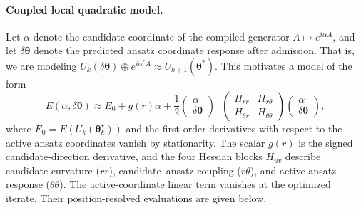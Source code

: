 \documentclass[
  reprint,
  amsmath,
  amssymb,
  aps,
  pra,
  nofootinbib,
  superscriptaddress,
  floatfix
]{revtex4-2}
\begin{document}
\paragraph*{Coupled local quadratic model.}
%
 Let \(\alpha\) denote the candidate coordinate of the compiled generator $A \mapsto e^{i\alpha A}$, and let $\delta \boldsymbol{\theta}$ denote the predicted ansatz coordinate response after admission. That is, we are modeling $U_k(\delta \boldsymbol{\theta})\oplus e^{i\alpha^* A}\approx U_{k+1}(\boldsymbol{\theta}^*)$. This motivates a model of the form
\begin{equation}
E(\alpha,\delta\boldsymbol\theta)
\approx
E_0+g(r)\alpha
+\frac12
\begin{pmatrix}
\alpha\\
\delta\boldsymbol\theta
\end{pmatrix}^{\!\top}
\begin{pmatrix}
H_{rr} & H_{r\theta}\\
H_{\theta r} & H_{\theta\theta}
\end{pmatrix}
\begin{pmatrix}
\alpha\\
\delta\boldsymbol\theta
\end{pmatrix},
\label{eq:local_quadratic}
\end{equation}
where \(E_0=E(U_k(\boldsymbol\theta_k^\star))\) and the first-order derivatives with respect to the active ansatz coordinates vanish by stationarity. The scalar \(g(r)\) is the
signed candidate-direction derivative, and the four Hessian blocks $H_{uv}$ describe
candidate curvature ($rr$), candidate--ansatz coupling ($r\theta$), and active-ansatz response ($\theta \theta$).
The active-coordinate linear term vanishes at the optimized iterate. Their position-resolved evaluations are given below.
\end{document}
